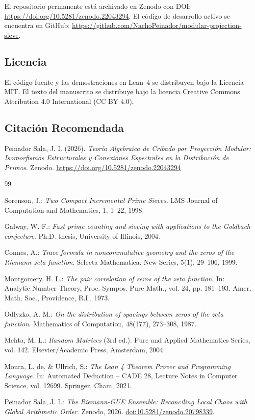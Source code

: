 \documentclass{article}
\numberwithin{equation}{section}
\theoremstyle{plain}
\theoremstyle{definition}
\begin{document}
El repositorio permanente está archivado en Zenodo con DOI: \url{https://doi.org/10.5281/zenodo.22043294}. El código de desarrollo activo se encuentra en GitHub: \url{https://github.com/NachoPeinador/modular-projection-sieve}.

\subsection*{Licencia}
El código fuente y las demostraciones en Lean~4 se distribuyen bajo la Licencia MIT. El texto del manuscrito se distribuye bajo la licencia Creative Commons Attribution 4.0 International (CC BY 4.0).

\subsection*{Citación Recomendada}
Peinador Sala, J. I. (2026). \textit{Teoría Algebraica de Cribado por Proyección Modular: Isomorfismos Estructurales y Conexiones Espectrales en la Distribución de Primos}. Zenodo. \url{https://doi.org/10.5281/zenodo.22043294}

\begin{thebibliography}{99}

Sorenson, J.: 
\emph{Two Compact Incremental Prime Sieves}.
LMS Journal of Computation and Mathematics, 1, 1--22, 1998.

Galway, W. F.: 
\emph{Fast prime counting and sieving with applications to the Goldbach conjecture}.
Ph.D. thesis, University of Illinois, 2004.

Connes, A.: 
\emph{Trace formula in noncommutative geometry and the zeros of the Riemann zeta function}.
Selecta Mathematica. New Series, 5(1), 29--106, 1999.

Montgomery, H. L.: 
\emph{The pair correlation of zeros of the zeta function}.
In: Analytic Number Theory, Proc. Sympos. Pure Math., vol. 24, pp. 181--193. Amer. Math. Soc., Providence, R.I., 1973.

Odlyzko, A. M.: 
\emph{On the distribution of spacings between zeros of the zeta function}.
Mathematics of Computation, 48(177), 273--308, 1987.

Mehta, M. L.: 
\emph{Random Matrices} (3rd ed.).
Pure and Applied Mathematics Series, vol. 142. Elsevier/Academic Press, Amsterdam, 2004.

Moura, L. de, \& Ullrich, S.:
\emph{The Lean 4 Theorem Prover and Programming Language}.
In: Automated Deduction – CADE 28, Lecture Notes in Computer Science, vol. 12699. Springer, Cham, 2021.

Peinador Sala, J. I.:
\emph{The Riemann-GUE Ensemble: Reconciling Local Chaos with Global Arithmetic Order}.
Zenodo, 2026. \href{https://doi.org/10.5281/zenodo.20798339}{doi:10.5281/zenodo.20798339}.

\end{thebibliography}
\end{document}
